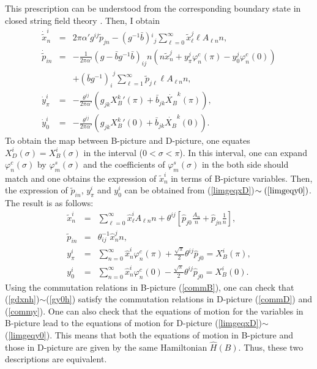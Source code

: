 \documentclass[a4paper,12pt]{article}
\newcommand{\nn}{\nonumber\\}
\newcommand{\co}{\varphi^c}
\newcommand{\si}{\varphi^s}
\newcommand{\XB}{X_B}
\newcommand{\XD}{X_D}
\begin{document}
This prescription can be understood
from the corresponding
boundary state in closed string field theory
\cite{Ish}\cite{Wilson,OkuB}.
Then, I obtain
\begin{eqnarray}
 \label{limgeqxD}
\dot{\tilde{x}}^i_n
&=&  2\pi\alpha' g^{ij} \tilde{p}_{j n}
-(g^{-1}\bar{b}){{}^i}_j 
\sum_{\ell=0}^{\infty} 
\tilde{x}_\ell^j
\ell A_{\ell n} n, \\
 \label{limgeqpD}
\dot{\tilde{p}}_{in} 
&=& -\frac{1}{2\pi\alpha'} 
\left( g-\bar{b}g^{-1}\bar{b} \right)_{ij} 
n 
\left(
n\tilde{x}^j_n 
+
 y^j_\pi  \co_n (\pi)
-y^j_0  \co_n (0)
\right) 
\nn
&&+
{(\bar{b}g^{-1})_i}^j 
\sum_{\ell=1}^\infty
\tilde{p}_{j\ell} \ell A_{\ell n} n , \\
\label{limgeqypi}
\dot{y}_\pi^i 
&=& - \frac{\theta^{ij}}{2\pi\alpha'}
\left(
 g_{jk} {\XB^k}'(\pi) + 
\bar{b}_{jk} \dot{\XB}^k(\pi)
\right), \\
 \label{limgeqy0}
\dot{y}_0^i 
&=& - \frac{\theta^{ij}}{2\pi\alpha'}
\left(
 g_{jk} {\XB^k}'(0) + 
\bar{b}_{jk} \dot{\XB}^k(0)
\right).
\end{eqnarray}
To obtain the map between B-picture and D-picture,
one equates $\XD^i(\sigma)=\XB^i(\sigma)$
in the interval ($0 < \sigma < \pi$).
In this interval, one can
expand $\co_n(\sigma)$ by $\si_m(\sigma)$ and
the coefficients of $\si_m(\sigma)$ in the 
both side should match and one obtains
the expression of $\tilde{x}_n^i$ in terms
of B-picture variables.
Then, the expression of 
$\tilde{p}_{in}$, $y_\pi^i$ and $y_0^i$
can be obtained
from (\ref{limgeqxD})$\sim(\ref{limgeqy0})$.
The result is as follows:
\begin{eqnarray}
\tilde{x}^i_n
&=&
\sum_{\ell=0}^\infty
\hat{x}^i_\ell A_{\ell n} n + 
\theta^{ij}
\left[
\hat{p}_{j0} \frac{A_n}{n} + \hat{p}_{jn} \frac{1}{n}
\right], \label{gdxnh}\\
\tilde{p}_{in}
&=&
\theta^{-1}_{ij}\hat{x}^j_n n,
 \label{gdpnh} \\
y_\pi^i &=& 
\sum_{n=0}^{\infty} \hat{x}_n^i \co_n(\pi) 
+ \frac{\sqrt{\pi}}{2}\theta^{ij} \hat{p}_{j0}
=
\XB^i(\pi), \label{gypih}\\
y_0^i &=& 
\sum_{n=0}^{\infty} \hat{x}_n^i \co_n(0)
- \frac{\sqrt{\pi}}{2} \theta^{ij}\hat{p}_{j0}
= \XB^i(0). \label{gy0h}
\end{eqnarray}
Using the commutation relations in
B-picture (\ref{commB}),
one can check that
(\ref{gdxnh})$\sim$(\ref{gy0h})
satisfy the commutation relations 
in D-picture (\ref{commD})
and (\ref{commy}).
One can also check 
that the equations of motion for
the variables in B-picture 
lead to the equations of motion for D-picture
(\ref{limgeqxD})$\sim$(\ref{limgeqy0}).
This means that
both the equations of motion in B-picture and
those in D-picture are given by
the same Hamiltonian $\hat{H}(B)$.
Thus, these two descriptions are equivalent.
\end{document}
